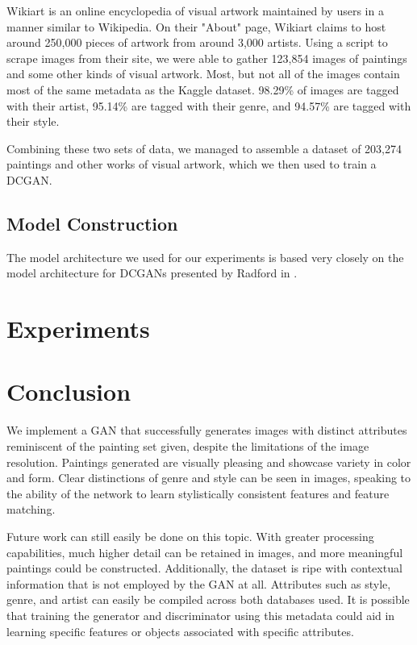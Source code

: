 \documentclass[10pt,twocolumn,letterpaper]{article}
\begin{document}
Wikiart is an online encyclopedia of visual artwork maintained by users in a manner similar to Wikipedia. On their "About" page, Wikiart claims to host around 250,000 pieces of artwork from around 3,000 artists. Using a script to scrape images from their site, we were able to gather 123,854 images of paintings and some other kinds of visual artwork. Most, but not all of the images contain most of the same metadata as the Kaggle dataset. 98.29\% of images are tagged with their artist, 95.14\% are tagged with their genre, and 94.57\% are tagged with their style.

Combining these two sets of data, we managed to assemble a dataset of 203,274 paintings and other works of visual artwork, which we then used to train a DCGAN.



\subsection{Model Construction}
The model architecture we used for our experiments is based very closely on the model architecture for DCGANs presented by Radford \etal in \cite{radford2015unsupervised}. 

\section{Experiments}


\section{Conclusion}
We implement a GAN that successfully generates images with distinct attributes reminiscent of the painting set given, despite the limitations of the image resolution. Paintings generated are visually pleasing and showcase variety in color and form. Clear distinctions of genre and style can be seen in images, speaking to the ability of the network to learn stylistically consistent features and feature matching.

Future work can still easily be done on this topic. With greater processing capabilities, much higher detail can be retained in images, and more meaningful paintings could be constructed. Additionally, the dataset is ripe with contextual information that is not employed by the GAN at all. Attributes such as style, genre, and artist can easily be compiled across both databases used. It is possible that training the generator and discriminator using this metadata could aid in learning specific features or objects associated with specific attributes. 
\end{document}
